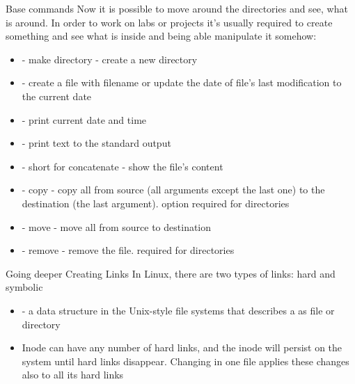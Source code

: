 \documentclass[usenames,dvipsnames,10pt,aspectratio=169]{beamer}
\begin{document}
\begin{frame}{Base commands}
    Now it is possible to move around the directories and see, what is around. In order to work on labs or projects it's usually required to create something and see what is inside and being able manipulate it somehow: \newline
    \begin{itemize}
        \item {} - make directory - create a new directory
        \item {} - create a file with filename or update the date of file's last modification to the current date
        \item {} - print current date and time
        \item {} - print text to the standard output
        \item {} - short for concatenate - show the file's content
        \item {} - copy - copy all from source (all arguments except the last one) to the destination (the last argument).  option required for directories
        \item {} - move - move all from source to destination
        \item {} - remove - remove the file.  required for directories
    \end{itemize}
\end{frame}

\begin{frame}{Going deeper}
    {\Large Creating Links} \newline 
    In Linux, there are two types of links: hard and symbolic
    \begin{itemize}
        \item {}- a data structure in the Unix-style file systems that describes a  as file or directory
        \item Inode can have any number of hard links, and the inode will persist on the system until  hard links disappear. Changing in one file applies these changes also to all its hard links
    \end{itemize}
\end{frame}
\end{document}
